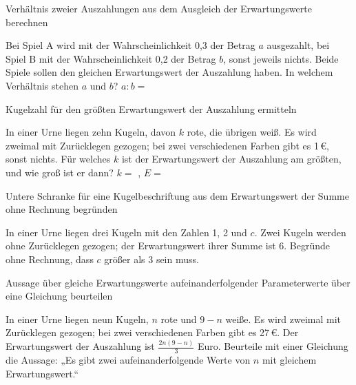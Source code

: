 \begin{aufgabe}{Verhältnis zweier Auszahlungen aus dem Ausgleich der Erwartungswerte berechnen}
\begin{teile}
\teil Bei Spiel A wird mit der Wahrscheinlichkeit 0{,}3 der Betrag $a$ ausgezahlt, bei Spiel B mit der Wahrscheinlichkeit 0{,}2 der Betrag $b$, sonst jeweils nichts. Beide Spiele sollen den gleichen Erwartungswert der Auszahlung haben. In welchem Verhältnis stehen $a$ und $b$? $a : b = $ \leerfeld
\end{teile}
\end{aufgabe}

\begin{aufgabe}{Kugelzahl für den größten Erwartungswert der Auszahlung ermitteln}
\begin{teile}
\teil In einer Urne liegen zehn Kugeln, davon $k$ rote, die übrigen weiß. Es wird zweimal mit Zurücklegen gezogen; bei zwei verschiedenen Farben gibt es 1\,€, sonst nichts. Für welches $k$ ist der Erwartungswert der Auszahlung am größten, und wie groß ist er dann? $k = $ \leerfeld , $E = $ \leerfeld[€]
\end{teile}
\end{aufgabe}

\begin{aufgabe}{Untere Schranke für eine Kugelbeschriftung aus dem Erwartungswert der Summe ohne Rechnung begründen}
\begin{teile}
\teil In einer Urne liegen drei Kugeln mit den Zahlen 1, 2 und $c$. Zwei Kugeln werden ohne Zurücklegen gezogen; der Erwartungswert ihrer Summe ist 6. Begründe ohne Rechnung, dass $c$ größer als 3 sein muss.
\end{teile}
\end{aufgabe}

\begin{aufgabe}{Aussage über gleiche Erwartungswerte aufeinanderfolgender Parameterwerte über eine Gleichung beurteilen}
\begin{teile}
\teil In einer Urne liegen neun Kugeln, $n$ rote und $9 - n$ weiße. Es wird zweimal mit Zurücklegen gezogen; bei zwei verschiedenen Farben gibt es 27\,€. Der Erwartungswert der Auszahlung ist $\frac{2n(9 - n)}{3}$ Euro. Beurteile mit einer Gleichung die Aussage: „Es gibt zwei aufeinanderfolgende Werte von $n$ mit gleichem Erwartungswert.“
\end{teile}
\end{aufgabe}

